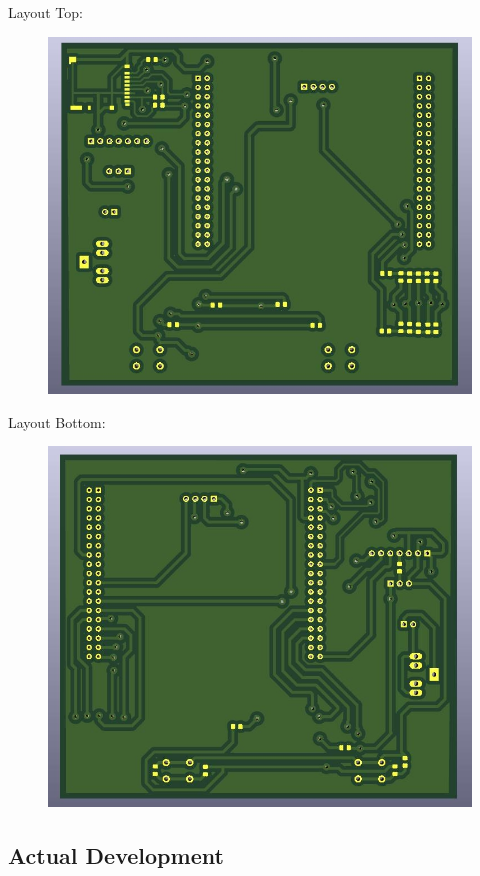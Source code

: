 \documentclass[12pt,]{article}
\begin{document}
	\newpage
	Layout Top:
	\begin{figure}[!ht]
		\centering
		\includegraphics[width=400pt]{images/top}
	\end{figure}

	Layout Bottom:
	\begin{figure}[!ht]
		\centering
		\includegraphics[width=400pt]{images/bottom}
	\end{figure}

	\newpage
	\subsection{Actual Development}
	
\end{document}
